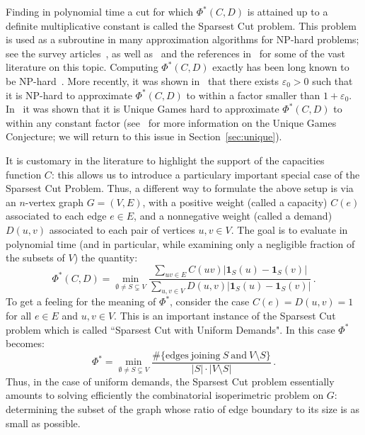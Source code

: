 \documentclass{icm2010}
\theoremstyle{definition}
\newcommand{\1}{\mathbf{1}}
\newcommand{\e}{\varepsilon}
\begin{document}
Finding in polynomial time a cut for which $\Phi^*(C,D)$ is attained
up to a definite multiplicative constant is called the Sparsest Cut
problem. This problem is used as a subroutine in many approximation
 algorithms for NP-hard problems; see the survey
 articles~\cite{Shmoys95,Chawla08}, as well as~\cite{LR99,AKRR90} and
 the references in~\cite{ARV04,ALN08} for some of the vast literature on this topic. Computing
$\Phi^*(C,D)$ exactly has been long known to be NP-hard~\cite{SM90}.
More recently, it was shown in~\cite{CK07} that there exists
$\e_0>0$ such that it is NP-hard to approximate $\Phi^*(C,D)$ to
within a factor smaller than $1+\e_0$. In~\cite{KV04,CKKRS06} it was
shown that it is Unique Games hard to approximate $\Phi^*(C,D)$ to
within any constant factor (see~\cite{Khot02,Khot10} for more information
on the Unique Games Conjecture; we will return to this issue in
Section~\ref{sec:unique}).



It is customary in the literature to highlight the support of the capacities function $C$:
this allows us to introduce a particulary important special case of the Sparsest Cut Problem. Thus, a different way to formulate the above setup is via an $n$-vertex graph $G=(V,E)$,
with a positive weight (called a capacity) $C(e)$ associated to each edge
$e\in E$, and a nonnegative weight (called a demand) $D(u,v)$ associated
to each pair of vertices $u,v\in V$. The goal is to evaluate in polynomial time
(and in particular, while examining only a negligible fraction of the subsets of $V$) the quantity:
\begin{equation*}\label{eq:def Phi}
\Phi^*(C,D)=\min_{\emptyset \neq S\subsetneq V}
\frac{\sum_{uv\in E}C(uv)\left|\1_S(u)-\1_S(v)\right|}{\sum_{u,v\in V}D(u,v)\left|\1_S(u)-\1_S(v)\right|}\,  .
\end{equation*}
To get a feeling
for the meaning of $\Phi^*$, consider the case $C(e)=D(u,v)=1$ for all $e\in E$ and $u,v\in V$. This is
an important instance of the Sparsest Cut problem which is called ``Sparsest Cut with Uniform Demands".
In this case $\Phi^*$ becomes:
\begin{equation*}\label{eq:def uniform}
\Phi^*= \min_{\emptyset \neq S\subsetneq V}\frac{\#\{\mathrm{edges\ joining}\ S\ \mathrm{and}\
V\setminus S\}}{|S|\cdot |V\setminus S|}\, .
\end{equation*}
Thus, in the case of uniform demands, the Sparsest Cut problem
essentially amounts to solving efficiently the combinatorial
isoperimetric problem on $G$: determining the subset of the graph
whose ratio of edge boundary to its size is as small as possible.
\end{document}
